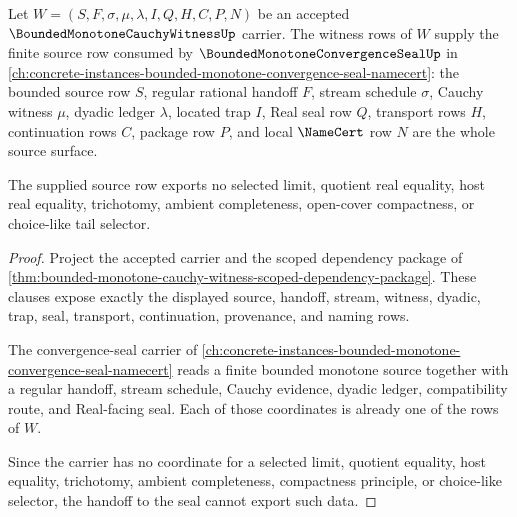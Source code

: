 \begin{theorem}
\label{thm:bounded-monotone-cauchy-witness-convergence-seal-source}
Let $W=(S,F,\sigma,\mu,\lambda,I,Q,H,C,P,N)$ be an accepted $\BoundedMonotoneCauchyWitnessUp$ carrier. The witness rows of $W$ supply the finite source row consumed by $\BoundedMonotoneConvergenceSealUp$ in \autoref{ch:concrete-instances-bounded-monotone-convergence-seal-namecert}: the bounded source row $S$, regular rational handoff $F$, stream schedule $\sigma$, Cauchy witness $\mu$, dyadic ledger $\lambda$, located trap $I$, Real seal row $Q$, transport rows $H$, continuation rows $C$, package row $P$, and local $\NameCert$ row $N$ are the whole source surface.

The supplied source row exports no selected limit, quotient real equality, host real equality, trichotomy, ambient completeness, open-cover compactness, or choice-like tail selector.
\end{theorem}
\begin{proof}
Project the accepted carrier and the scoped dependency package of \autoref{thm:bounded-monotone-cauchy-witness-scoped-dependency-package}. These clauses expose exactly the displayed source, handoff, stream, witness, dyadic, trap, seal, transport, continuation, provenance, and naming rows.

The convergence-seal carrier of \autoref{ch:concrete-instances-bounded-monotone-convergence-seal-namecert} reads a finite bounded monotone source together with a regular handoff, stream schedule, Cauchy evidence, dyadic ledger, compatibility route, and Real-facing seal. Each of those coordinates is already one of the rows of $W$.

Since the carrier has no coordinate for a selected limit, quotient equality, host equality, trichotomy, ambient completeness, compactness principle, or choice-like selector, the handoff to the seal cannot export such data.
\end{proof}


